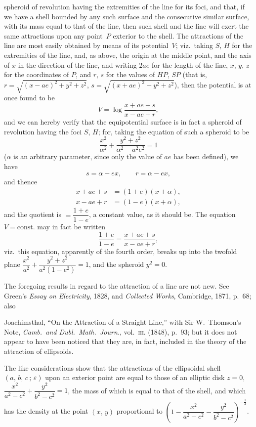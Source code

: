 \documentclass[11pt,a4paper]{article}
\theoremstyle{plain}
\theoremstyle{definition}
\begin{document}
spheroid of revolution having the extremities of the line for its foci, and that, if
we have a shell bounded by any such surface and the consecutive similar surface, with
its mass equal to that of the line, then such shell and the line will exert the same
attractions upon any point~$P$ exterior to the shell.  The attractions of the line are
most easily obtained by means of its potential~$V$; viz.\ taking $S$, $H$ for the extremities
of the line, and, as above, the origin at the middle point, and the axis of $x$ in the
direction of the line, and writing $2ae$ for the length of the line, $x$, $y$, $z$ for the
coordinates of $P$, and $r$, $s$ for the values of $HP$, $SP$
\bigl(that is, $r = \sqrt{(x - ae)^2 + y^2 + z^2}$,
$s = \sqrt{(x + ae)^2 + y^2 + z^2}$\bigr), then the potential is at once found to be
\[
V = \log\frac{x + ae + s}{x - ae + r},
\]
and we can hereby verify that the equipotential surface is in fact a spheroid of
revolution having the foci $S$, $H$; for, taking the equation of such a spheroid to be
\[
\frac{x^2}{\alpha^2} + \frac{y^2 + z^2}{\alpha^2 - a^2 e^2} = 1
\]
($\alpha$ is an arbitrary parameter, since only the value of $ae$ has been defined), we have
\[
s = \alpha + ex,\qquad r = \alpha - ex,
\]
and thence
\begin{align*}
x + ae + s &= (1 + e)(x + \alpha), \\
x - ae + r &= (1 - e)(x + \alpha),
\end{align*}
and the quotient is $= \dfrac{1 + e}{1 - e}$, a constant value, as it should be.  The equation
$V = \text{const.}$ may in fact be written
\[
\frac{1 + e}{1 - e} = \frac{x + ae + s}{x - ae + r},
\]
viz.\ this equation, apparently of the fourth order, breaks up into the twofold plane
$\dfrac{x^2}{a^2} + \dfrac{y^2 + z^2}{a^2(1-e^2)} = 1$, and the spheroid $y^2 = 0$.

The foregoing results in regard to the attraction of a line are not new.  See
Green's \textit{Essay on Electricity}, 1828, and \textit{Collected Works}, Cambridge, 1871, p.~68; also

\clearpage

Joachimsthal, ``On the Attraction of a Straight Line,'' with Sir W.\ Thomson's Note,
\textit{Camb.\ and Dubl.\ Math.\ Journ.}, vol.~\textsc{iii}. (1848), p.~93; but it does not appear to have
been noticed that they are, in fact, included in the theory of the attraction of
ellipsoids.

The like considerations show that the attractions of the ellipsoidal shell $(a,\,b,\,c\,;\,\varepsilon)$
upon an exterior point are equal to those of an elliptic disk $z = 0$, $\dfrac{x^2}{a^2-c^2} + \dfrac{y^2}{b^2-c^2} = 1$,
the mass of which is equal to that of the shell, and which has the density at the
point $(x,\,y)$ proportional to $\left(1 - \dfrac{x^2}{a^2-c^2} - \dfrac{y^2}{b^2-c^2}\right)^{-\frac{1}{2}}$.
\end{document}
